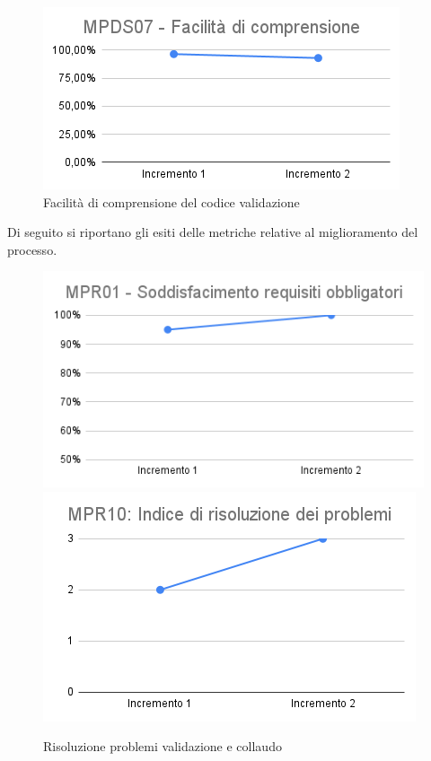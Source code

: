 \begin{figure}[h!]
	\centering
	\includegraphics[scale=0.6]{Immagini/MPDS07_FComprensioneValidazione.png}
	\caption{Facilità di comprensione del codice validazione}
	\label{fig:FacilitàCodiceValidazione}
\end{figure}

Di seguito si riportano gli esiti delle metriche relative al miglioramento del processo.
\begin{figure}[h!]
	\includegraphics[scale=0.58]{Immagini/MPR01_RObbligatoriValidazione.png}\quad
	\includegraphics[scale=0.58]{Immagini/MPR10_rproblemiValidazione.png}
	\caption{Risoluzione problemi validazione e collaudo}
	\label{fig:MPR10codificaValidazione}
\end{figure}
